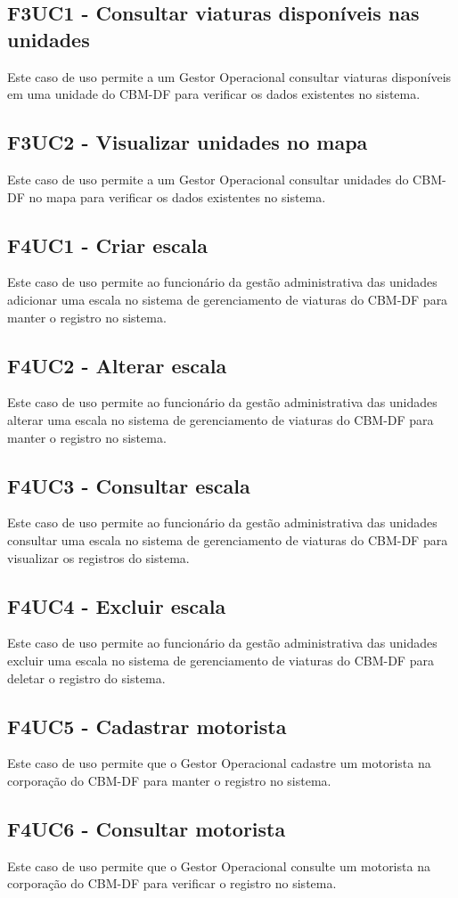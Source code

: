   \subsection{F3UC1 - Consultar viaturas disponíveis nas unidades}
Este caso de uso permite a um Gestor Operacional consultar viaturas disponíveis em uma unidade do CBM-DF para verificar os dados existentes no sistema.
  \subsection{F3UC2 - Visualizar unidades no mapa}
Este caso de uso permite a um Gestor Operacional consultar unidades do CBM-DF no mapa para verificar os dados existentes no sistema.
  \subsection{F4UC1 - Criar escala}
Este caso de uso permite ao funcionário da gestão administrativa das unidades adicionar uma escala no sistema de gerenciamento de viaturas do CBM-DF para manter o registro no sistema.
  \subsection{F4UC2 - Alterar escala}
Este caso de uso permite ao funcionário da gestão administrativa das unidades alterar uma escala no sistema de gerenciamento de viaturas do CBM-DF para manter o registro no sistema.
  \subsection{F4UC3 - Consultar escala}
Este caso de uso permite ao funcionário da gestão administrativa das unidades consultar uma escala no sistema de gerenciamento de viaturas do CBM-DF para visualizar os registros do sistema.
  \subsection{F4UC4 - Excluir escala}
Este caso de uso permite ao funcionário da gestão administrativa das unidades  excluir uma escala no sistema de gerenciamento de viaturas do CBM-DF para deletar o registro do sistema.
  \subsection{F4UC5 - Cadastrar motorista}
Este caso de uso permite que o Gestor Operacional cadastre um motorista na corporação do CBM-DF para manter o registro no sistema.
  \subsection{F4UC6 - Consultar motorista}
Este caso de uso permite que o Gestor Operacional consulte um motorista na corporação do CBM-DF para verificar o registro no sistema.
